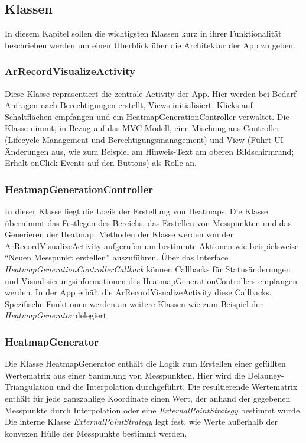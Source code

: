\documentclass[10pt]{scrartcl}
\begin{document}
\subsection{Klassen}
In diesem Kapitel sollen die wichtigsten Klassen kurz in ihrer Funktionalität beschrieben werden um einen Überblick über die Architektur der App zu geben.

\subsubsection{ArRecordVisualizeActivity}
\label{MainActivity}
Diese Klasse repräsentiert die zentrale Activity der App. Hier werden bei Bedarf Anfragen nach Berechtigungen erstellt, Views initialisiert, Klicks auf Schaltflächen empfangen und ein HeatmapGenerationController verwaltet. Die Klasse nimmt, in Bezug auf das MVC-Modell, eine Mischung aus Controller (Lifecycle-Management und Berechtigungsmanagement) und View (Führt UI-Änderungen aus, wie zum Beispiel am Hinweis-Text am oberen Bildschirmrand; Erhält onClick-Events auf den Buttons) als Rolle an. 

\subsubsection{HeatmapGenerationController}
In dieser Klasse liegt die Logik der Erstellung von Heatmaps. Die Klasse übernimmt das Festlegen des Bereichs, das Erstellen von Messpunkten und das Generieren der Heatmap. Methoden der Klasse werden von der ArRecordVisualizeActivity aufgerufen um bestimmte Aktionen wie beispielsweise \enquote{Neuen Messpunkt erstellen} auszuführen. Über das Interface \textit{HeatmapGenerationControllerCallback} können Callbacks für Statusänderungen und Visualisierungsinformationen des HeatmapGenerationControllers empfangen werden. In der App erhält die ArRecordVisualizeActivity diese Callbacks. Spezifische Funktionen werden an weitere Klassen wie zum Beispiel den \textit{HeatmapGenerator} delegiert.

\subsubsection{HeatmapGenerator}
Die Klasse HeatmapGenerator enthält die Logik zum Erstellen einer gefüllten Wertematrix aus einer Sammlung von Messpunkten. Hier wird die Delauney-Triangulation und die Interpolation durchgeführt. Die resultierende Wertematrix enthält für jede ganzzahlige Koordinate einen Wert, der anhand der gegebenen Messpunkte durch Interpolation oder eine \textit{ExternalPointStrategy} bestimmt wurde. Die interne Klasse \textit{ExternalPointStrategy} legt fest, wie Werte außerhalb der konvexen Hülle der Messpunkte bestimmt werden.
\end{document}
